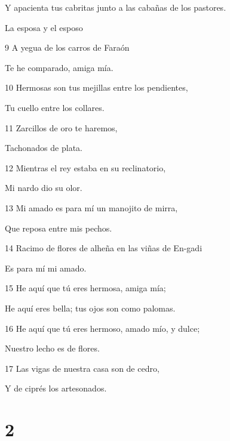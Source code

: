 \par Y apacienta tus cabritas junto a las cabañas de los pastores. 
\par La esposa y el esposo
\par 9 A yegua de los carros de Faraón
\par Te he comparado, amiga mía.
\par 10 Hermosas son tus mejillas entre los pendientes,
\par Tu cuello entre los collares.
\par 11 Zarcillos de oro te haremos,
\par Tachonados de plata.
\par 12 Mientras el rey estaba en su reclinatorio,
\par Mi nardo dio su olor.
\par 13 Mi amado es para mí un manojito de mirra,
\par Que reposa entre mis pechos.
\par 14 Racimo de flores de alheña en las viñas de En-gadi
\par Es para mí mi amado.
\par 15 He aquí que tú eres hermosa, amiga mía; 
\par He aquí eres bella; tus ojos son como palomas.
\par 16 He aquí que tú eres hermoso, amado mío, y dulce;
\par Nuestro lecho es de flores.
\par 17 Las vigas de nuestra casa son de cedro,
\par Y de ciprés los artesonados.

\chapter{2}

